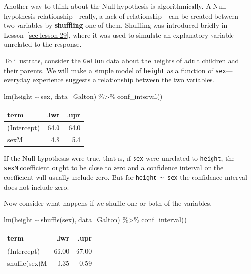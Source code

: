 \documentclass[
  letterpaper,
  DIV=11,
  numbers=noendperiod,
  oneside]{scrreprt}
\newenvironment{Shaded}{\begin{snugshade}}{\end{snugshade}}
\newcommand{\AttributeTok}[1]{\textcolor[rgb]{0.40,0.45,0.13}{#1}}
\newcommand{\FunctionTok}[1]{\textcolor[rgb]{0.28,0.35,0.67}{#1}}
\newcommand{\NormalTok}[1]{\textcolor[rgb]{0.00,0.23,0.31}{#1}}
\newcommand{\SpecialCharTok}[1]{\textcolor[rgb]{0.37,0.37,0.37}{#1}}
\begin{document}
Another way to think about the Null hypothesis is algorithmically. A
Null-hypothesis relationship---really, a lack of relationship---can be
created between two variables by \textbf{shuffling} one of them.
Shuffling was introduced briefly in Lesson~\ref{sec-lesson-29}, where it
was used to simulate an explanatory variable unrelated to the response.

To illustrate, consider the \texttt{Galton} data about the heights of
adult children and their parents. We will make a simple model of
\texttt{height} as a function of \texttt{sex}---everyday experience
suggests a relationship between the two variables.

\begin{Shaded}
\begin{Highlighting}[]
\FunctionTok{lm}\NormalTok{(height }\SpecialCharTok{\textasciitilde{}}\NormalTok{ sex, }\AttributeTok{data=}\NormalTok{Galton) }\SpecialCharTok{\%\textgreater{}\%} \FunctionTok{conf\_interval}\NormalTok{()}
\end{Highlighting}
\end{Shaded}

\ttfamily 
\begin{tabular}{lrr}
\toprule
term & .lwr & .upr\\
\midrule
(Intercept) & 64.0 & 64.0\\
sexM & 4.8 & 5.4\\
\bottomrule
\end{tabular} \normalfont
\bigskip

If the Null hypothesis were true, that is, if \texttt{sex} were
unrelated to \texttt{height}, the \texttt{sexM} coefficient ought to be
close to zero and a confidence interval on the coefficient will usually
include zero. But for \texttt{height\ \textasciitilde{}\ sex} the
confidence interval does not include zero.

Now consider what happens if we shuffle one or both of the variables.

\begin{Shaded}
\begin{Highlighting}[]
\FunctionTok{lm}\NormalTok{(height }\SpecialCharTok{\textasciitilde{}} \FunctionTok{shuffle}\NormalTok{(sex), }\AttributeTok{data=}\NormalTok{Galton) }\SpecialCharTok{\%\textgreater{}\%} \FunctionTok{conf\_interval}\NormalTok{()}
\end{Highlighting}
\end{Shaded}

\ttfamily 
\begin{tabular}{lrr}
\toprule
term & .lwr & .upr\\
\midrule
(Intercept) & 66.00 & 67.00\\
shuffle(sex)M & -0.35 & 0.59\\
\bottomrule
\end{tabular} \normalfont
\bigskip
\end{document}
